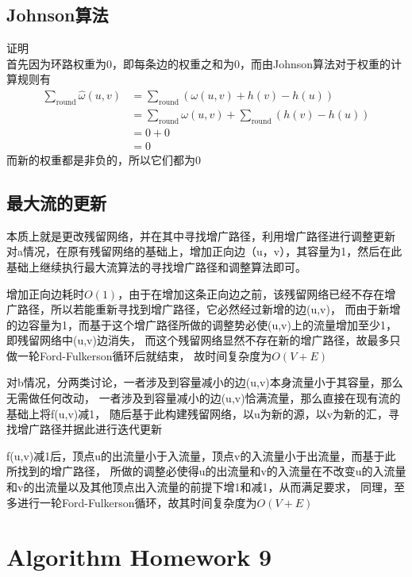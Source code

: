 \documentclass[cn,11pt,chinese]{elegantbook}
\begin{document}
\section{Johnson算法}
证明\\
首先因为环路权重为0，即每条边的权重之和为0，而由Johnson算法对于权重的计算规则有
\begin{equation}
	\begin{aligned}
		\sum_{\mbox{round}} \hat{\omega }(u,v) &= \sum_{\mbox{round}} (\omega (u,v)+h(v)-h(u)) \\
		&= \sum_{\mbox{round}} \omega (u,v) + \sum_{\mbox{round}} (h(v)- h(u)) \\
		&= 0 + 0 \\
		&= 0
	\end{aligned}
	\nonumber
\end{equation}
而新的权重都是非负的，所以它们都为0

\section{最大流的更新}

本质上就是更改残留网络，并在其中寻找增广路径，利用增广路径进行调整更新\\
对a情况，在原有残留网络的基础上，增加正向边（u，v），其容量为1，然后在此基础上继续执行最大流算法的寻找增广路径和调整算法即可。

增加正向边耗时$O(1)$，由于在增加这条正向边之前，该残留网络已经不存在增广路径，所以若能重新寻找到增广路径，它必然经过新增的边(u,v)，
而由于新增的边容量为1，而基于这个增广路径所做的调整势必使(u,v)上的流量增加至少1，即残留网络中(u,v)边消失，
而这个残留网络显然不存在新的增广路径，故最多只做一轮Ford-Fulkerson循环后就结束，
故时间复杂度为$O(V+E)$

对b情况，分两类讨论，一者涉及到容量减小的边(u,v)本身流量小于其容量，那么无需做任何改动，
一者涉及到容量减小的边(u,v)恰满流量，那么直接在现有流的基础上将f(u,v)减1，
随后基于此构建残留网络，以u为新的源，以v为新的汇，寻找增广路径并据此进行迭代更新

f(u,v)减1后，顶点u的出流量小于入流量，顶点v的入流量小于出流量，而基于此所找到的增广路径，
所做的调整必使得u的出流量和v的入流量在不改变u的入流量和v的出流量以及其他顶点出入流量的前提下增1和减1，从而满足要求，
同理，至多进行一轮Ford-Fulkerson循环，故其时间复杂度为$O(V+E)$

\chapter{Algorithm Homework 9}
\end{document}
